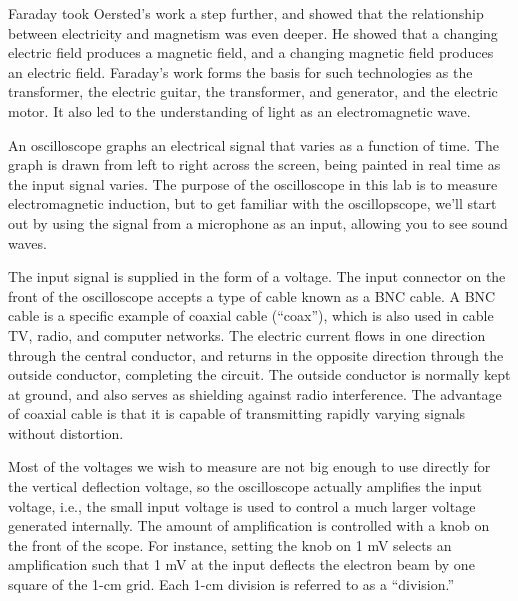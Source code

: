 Faraday took Oersted's work a step further, and showed that
the relationship between electricity and magnetism was even
deeper. He showed that a changing electric field produces a
magnetic field, and a changing magnetic field produces an
electric field. Faraday's work forms the basis for such
technologies as the transformer, the electric guitar, the
transformer, and generator, and the electric motor. It also
led to the understanding of light as an electromagnetic wave.



An oscilloscope graphs an electrical signal that varies as
a function of time.
The graph is drawn from left to right across the screen,
being painted in real time as the input signal varies.
The purpose of the oscilloscope in this lab is to measure
electromagnetic induction, but to get familiar with the oscillopscope, we'll start out by
using the signal from a microphone as an input,
allowing you to see sound waves. 

The input signal is
supplied in the form of a voltage.
The input connector on the front of the oscilloscope
accepts a type of cable
known as a BNC cable.
A BNC cable is a specific example of coaxial cable
(``coax''), which is also used in cable TV, radio, and
computer networks. The electric current flows in one direction
through the central conductor, and returns in the opposite
direction through the outside conductor, completing the
circuit. The outside conductor is normally kept at ground,
and also serves as shielding against radio interference. 
The advantage of coaxial cable is that it is capable of
transmitting rapidly varying signals without distortion.


Most of the voltages we wish to measure are not big enough
to use directly for the vertical deflection voltage, so the
oscilloscope actually amplifies the input voltage, i.e., the
small input voltage is used to control a much larger voltage
generated internally. The amount of amplification is
controlled with a knob on the front of the scope. For
instance, setting the knob on 1 mV selects an amplification
such that 1 mV at the input deflects the electron beam by
one square of the 1-cm grid. Each 1-cm division is referred
to as a ``division.''


